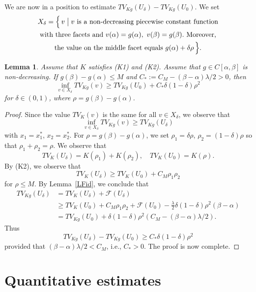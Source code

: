 \documentclass[12pt, reqno]{amsart}
\numberwithin{equation}{section}
\newtheorem{lemma}[thm]{Lemma}
\begin{document}
We are now in a position to estimate $TV_{Kg}(U_\delta)-TV_{Kg}(U_0)$.
 We set
\begin{multline*}
	X_\delta = \Big\{\, v \bigm|
	v\ \text{is a non-decreasing piecewise constant function} \\
	\text{with three facets and}\ 
	v(\alpha)=g(\alpha),\ v(\beta)=g(\beta). \ \text{Moreover,} \\
	\text{the value on the middle facet equals}\ 
	g(\alpha)+\delta\rho\, \Big\}.
\end{multline*}
%
\begin{lemma} \label{LND}
Assume that $K$ satisfies (K1) and (K2).
 Assume that $g\in C[\alpha,\beta]$ is non-decreasing.
 If $g(\beta)-g(\alpha)\leq M$ and $C_*:=C_M-(\beta-\alpha)\lambda/2>0$, then
\[
	\inf_{v\in X_\delta} TV_{Kg}(v) \geq TV_{Kg}(U_0)
	+ C_* \delta(1-\delta)\rho^2
\]
for $\delta\in(0,1)$, where $\rho=g(\beta)-g(\alpha)$.
\end{lemma}
%
\begin{proof}
Since the value $TV_K(v)$ is the same for all $v\in X_\delta$, we observe that
\[
	\inf_{v\in X_\delta} TV_{Kg}(v) \geq TV_{Kg}(U_\delta)
\]
with $x_1=x_1^*$, $x_2=x_2^*$.
 For $\rho=g(\beta)-g(\alpha)$, we set $\rho_1=\delta\rho$, $\rho_2=(1-\delta)\rho$ so that $\rho_1+\rho_2=\rho$.
 We observe that
\[
	TV_K(U_\delta) = K(\rho_1) + K(\rho_2), \quad
	TV_K(U_0) = K(\rho).
\]
By (K2), we observe that
\[
	TV_K(U_\delta) \geq TV_K(U_0) + C_M \rho_1 \rho_2
\]
for $\rho\leq M$.
 By Lemma~\ref{LFid}, we conclude that
\begin{align*}
	TV_{Kg}(U_\delta) &= TV_K(U_\delta) + \mathcal{F}(U_\delta) \\
	&\geq TV_K(U_0) + C_M \rho_1 \rho_2 + \mathcal{F}(U_0) 
	- \frac{\lambda}{2} \delta(1 - \delta)\rho^2 (\beta - \alpha) \\
	&= TV_{Kg}(U_0) + \delta(1 - \delta)\rho^2 \left(C_M - (\beta - \alpha) \lambda/2 \right).
\end{align*}
Thus
\[
	TV_{Kg}(U_\delta) - TV_{Kg}(U_0) \geq C_* \delta(1-\delta)\rho^2
\]
provided that $(\beta-\alpha)\lambda/2<C_M$, i.e., $C_*>0$.
The proof is now complete.
\end{proof}
%
\section{Quantitative estimates} \label{SQ} %
\end{document}
